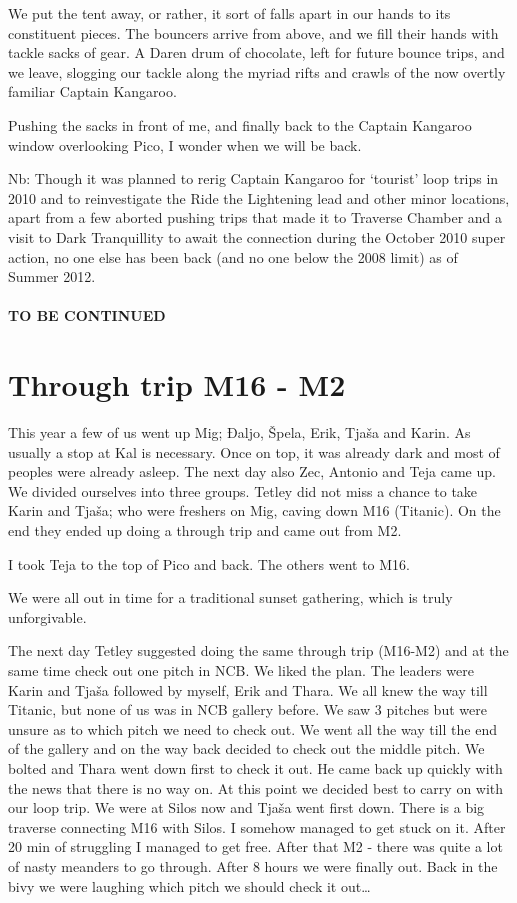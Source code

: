 We put the tent away, or rather, it sort of falls apart in our hands to
its constituent pieces. The bouncers arrive from above, and we fill
their hands with tackle sacks of gear. A Daren drum of chocolate, left
for future bounce trips, and we leave, slogging our tackle along the
myriad rifts and crawls of the now overtly familiar Captain Kangaroo.

Pushing the sacks in front of me, and finally back to the Captain
Kangaroo window overlooking Pico, I wonder when we will be back.

Nb: Though it was planned to rerig Captain Kangaroo for `tourist' loop
trips in 2010 and to reinvestigate the Ride the Lightening lead and
other minor locations, apart from a few aborted pushing trips that made
it to Traverse Chamber and a visit to Dark Tranquillity to await the
connection during the October 2010 super action, no one else has been
back (and no one below the 2008 limit) as of Summer 2012.

\paragraph{TO BE CONTINUED}\label{to-be-continued}


\section{Through trip M16 - M2}\label{through-trip-m16---m2}

This year a few of us went up Mig; Đaljo, Špela, Erik, Tjaša and Karin.
As usually a stop at Kal is necessary. Once on top, it was already dark
and most of peoples were already asleep. The next day also Zec, Antonio
and Teja came up. We divided ourselves into three groups. Tetley did not
miss a chance to take Karin and Tjaša; who were freshers on Mig, caving
down M16 (Titanic). On the end they ended up doing a through trip and
came out from M2.

I took Teja to the top of Pico and back. The others went to M16.

We were all out in time for a traditional sunset gathering, which is
truly unforgivable.

The next day Tetley suggested doing the same through trip (M16-M2) and
at the same time check out one pitch in NCB. We liked the plan. The
leaders were Karin and Tjaša followed by myself, Erik and Thara. We all
knew the way till Titanic, but none of us was in NCB gallery before. We
saw 3 pitches but were unsure as to which pitch we need to check out. We
went all the way till the end of the gallery and on the way back decided
to check out the middle pitch. We bolted and Thara went down first to
check it out. He came back up quickly with the news that there is no way
on. At this point we decided best to carry on with our loop trip. We
were at Silos now and Tjaša went first down. There is a big traverse
connecting M16 with Silos. I somehow managed to get stuck on it. After
20 min of struggling I managed to get free. After that M2 - there was
quite a lot of nasty meanders to go through. After 8 hours we were
finally out. Back in the bivy we were laughing which pitch we should
check it out\ldots{}

